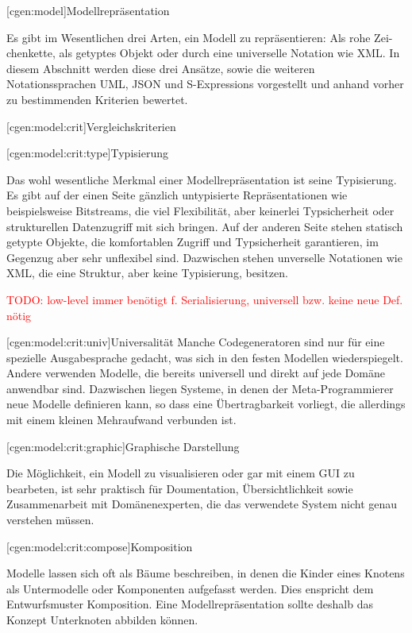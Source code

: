 \documentclass[a4paper, bibgerm]{book}
\newcommand{\todo}[1]{
  \textcolor{red}{TODO: #1}
}
\newcommand\lsection{}
\newcommand\lsubsection{}
\newcommand\lsubsubsection{}
\begin{document}
\lsection[cgen:model]{Modellrepräsentation}

Es gibt im Wesentlichen drei Arten, ein Modell zu repräsentieren: Als
rohe Zei- chenkette, als getyptes Objekt oder durch eine universelle
Notation wie XML.  In diesem Abschnitt werden diese drei Ansätze, sowie
die weiteren Notationssprachen UML, JSON und S-Expressions vorgestellt
und anhand vorher zu bestimmenden Kriterien bewertet.

\lsubsection[cgen:model:crit]{Vergleichskriterien}

\lsubsubsection[cgen:model:crit:type]{Typisierung}

Das wohl wesentliche Merkmal einer Modellrepräsentation ist seine
Typisierung. Es gibt auf der einen Seite gänzlich untypisierte
Repräsentationen wie beispielsweise Bitstreams, die viel Flexibilität,
aber keinerlei Typsicherheit oder strukturellen Datenzugriff mit sich
bringen. Auf der anderen Seite stehen statisch getypte Objekte, die
komfortablen Zugriff und Typsicherheit garantieren, im Gegenzug aber
sehr unflexibel sind. Dazwischen stehen unverselle Notationen wie XML,
die eine Struktur, aber keine Typisierung, besitzen.

\todo{low-level immer benötigt f. Serialisierung, universell bzw. keine neue Def. nötig}

\lsubsubsection[cgen:model:crit:univ]{Universalität} Manche
Codegeneratoren sind nur für eine spezielle Ausgabesprache gedacht, was
sich in den festen Modellen wiederspiegelt. Andere verwenden Modelle,
die bereits universell und direkt auf jede Domäne anwendbar
sind. Dazwischen liegen Systeme, in denen der Meta-Programmierer neue
Modelle definieren kann, so dass eine Übertragbarkeit vorliegt, die
allerdings mit einem kleinen Mehraufwand verbunden ist.

\lsubsubsection[cgen:model:crit:graphic]{Graphische Darstellung}

Die Möglichkeit, ein Modell zu visualisieren oder gar mit einem GUI zu
bearbeten, ist sehr praktisch für Doumentation, Übersichtlichkeit sowie
Zusammenarbeit mit Domänenexperten, die das verwendete System nicht
genau verstehen müssen.

\lsubsubsection[cgen:model:crit:compose]{Komposition}

Modelle lassen sich oft als Bäume beschreiben, in denen die Kinder eines
Knotens als Untermodelle oder Komponenten aufgefasst werden. Dies
enspricht dem Entwurfsmuster Komposition\cite{TODO}. Eine
Modellrepräsentation sollte deshalb das Konzept Unterknoten abbilden
können.
\end{document}
